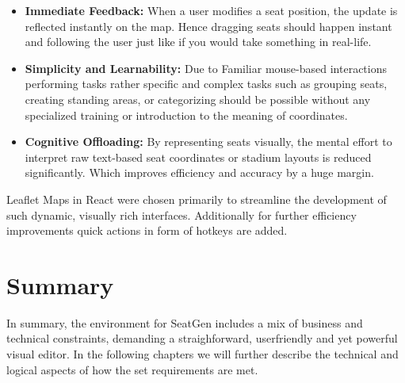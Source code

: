 \begin{itemize}
    \item \textbf{Immediate Feedback:} When a user modifies a seat position, the update is reflected instantly on the map. Hence dragging seats should happen instant and following the user just like if you would take something in real-life.
    \item \textbf{Simplicity and Learnability:} Due to Familiar mouse-based interactions performing tasks rather specific and complex tasks such as grouping seats, creating standing areas, or categorizing should be possible without any specialized training or introduction to the meaning of coordinates.
    \item \textbf{Cognitive Offloading:} By representing seats visually, the mental effort to interpret raw text-based seat coordinates or stadium layouts is reduced significantly. Which improves efficiency and accuracy by a huge margin.
\end{itemize}

Leaflet Maps in React were chosen primarily to streamline the development of such dynamic, visually rich interfaces. Additionally for further efficiency improvements quick actions in form of hotkeys are added.

\section{Summary}
In summary, the environment for SeatGen includes a mix of business and technical constraints, demanding a straighforward, userfriendly and yet powerful visual editor. In the following chapters we will further describe the technical and logical aspects of how the set requirements are met.